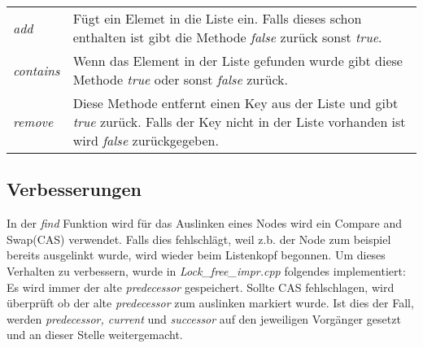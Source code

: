 \documentclass[10pt,a4paper,titlepage,oneside]{article}
\begin{document}
\begin{table}[H]
    \begin{tabularx}{\textwidth}{lX}
        \textit{add} & Fügt ein Elemet in die Liste ein. Falls dieses schon enthalten ist gibt die Methode \textit{false} zurück sonst \textit{true}. \\
        \textit{contains} & Wenn das Element in der Liste gefunden wurde gibt diese Methode \textit{true} oder sonst \textit{false} zurück. \\
        \textit{remove} & Diese Methode entfernt einen Key aus der Liste und gibt \textit{true} zurück. Falls der Key nicht in der Liste vorhanden ist wird \textit{false} zurückgegeben. \\
    \end{tabularx}
\end{table}




\subsection{Verbesserungen}
\label{subsec:impr}
In der \textit{find} Funktion wird für das Auslinken eines Nodes wird ein Compare and Swap(CAS) verwendet. Falls dies fehlschlägt, 
weil z.b. der Node zum beispiel bereits ausgelinkt wurde,
wird wieder beim Listenkopf begonnen. Um dieses Verhalten zu verbessern, wurde in \textit{Lock\_free\_impr.cpp} folgendes implementiert:\\
Es wird immer der alte \textit{predecessor} gespeichert. Sollte CAS fehlschlagen, wird überprüft ob der alte \textit{predecessor}
zum auslinken markiert wurde. Ist dies der Fall, werden \textit{predecessor, current} und \textit{successor} auf den jeweiligen Vorgänger
gesetzt und an dieser Stelle weitergemacht. 


 
 

	


		
\end{document}
